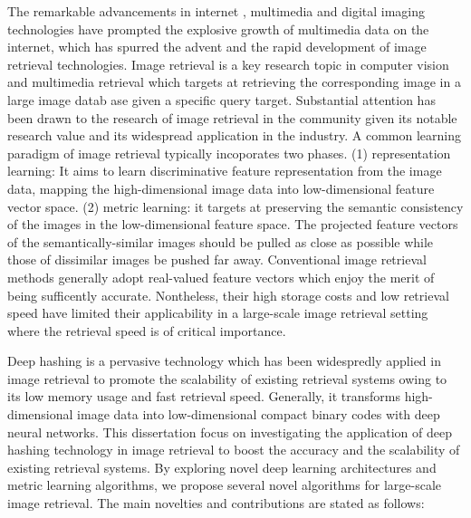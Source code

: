 \begin{abstract*}
The remarkable advancements in internet , multimedia  and digital imaging technologies have prompted the explosive growth of multimedia data on the internet, which has spurred the advent and the rapid development of image retrieval technologies. Image retrieval is a key research topic in computer vision and multimedia retrieval which targets at retrieving the corresponding image in a large image datab ase given a specific query target. Substantial attention has been drawn to the research of image retrieval in the community given its notable research value and its widespread application in the industry. A common learning paradigm of image retrieval typically incoporates two phases. (1) representation learning: It aims to learn discriminative feature representation from the image data, mapping the high-dimensional image data into low-dimensional feature vector space.  (2) metric learning: it targets at preserving the semantic consistency of the images in the low-dimensional feature space. The projected feature vectors of the semantically-similar images should be pulled as close as possible while those of  dissimilar images be pushed far away. Conventional image retrieval methods generally adopt real-valued feature vectors which enjoy the merit of being sufficently accurate. Nontheless, their high storage costs and low retrieval speed have limited their applicability in a large-scale image retrieval setting where the retrieval speed is of critical importance. \par
Deep hashing is a pervasive technology which has been widespredly applied in image retrieval to promote the scalability of existing retrieval systems owing to its low memory usage and fast retrieval speed. Generally, it transforms high-dimensional image data into low-dimensional compact binary codes with deep neural networks. This dissertation focus on investigating the application of deep hashing technology in image retrieval to boost the accuracy and the scalability of existing retrieval systems.  By exploring novel deep learning architectures and metric learning algorithms, we propose several novel algorithms for large-scale image retrieval. The main novelties and contributions are stated as follows:
\begin{enumerate}

\end{enumerate}
\end{abstract*}

